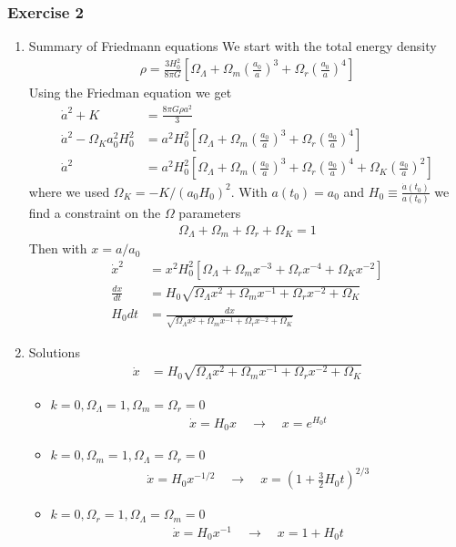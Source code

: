 \documentclass[10pt,a4paper]{article}
\theoremstyle{definition}
\begin{document}
\subsubsection{Exercise 2}
\begin{enumerate}
\item Summary of Friedmann equations
We start with the total energy density
\begin{align}
\rho=\frac{3H_0^2}{8\pi G}\left[
\Omega_\Lambda+
\Omega_m\left(\frac{a_0}{a}\right)^3+
\Omega_r\left(\frac{a_0}{a}\right)^4\right]
\end{align}
Using the Friedman equation we get
\begin{align}
\dot{a}^2+K
&=\frac{8\pi G\rho a^2}{3}\\
\dot{a}^2-\Omega_Ka_0^2H_0^2&=a^2H_0^2\left[
\Omega_\Lambda+
\Omega_m\left(\frac{a_0}{a}\right)^3+
\Omega_r\left(\frac{a_0}{a}\right)^4\right]\\
\dot{a}^2&=a^2H_0^2\left[
\Omega_\Lambda+
\Omega_m\left(\frac{a_0}{a}\right)^3+
\Omega_r\left(\frac{a_0}{a}\right)^4+
\Omega_K\left(\frac{a_0}{a}\right)^2\right]
\end{align}
where we used $\Omega_K=-K/(a_0H_0)^2$. With $a(t_0)=a_0$ and $H_0\equiv\frac{\dot{a}(t_0)}{a(t_0)}$ we find a constraint on the $\Omega$ parameters
\begin{align}
\Omega_\Lambda+\Omega_m+\Omega_r+\Omega_K=1
\end{align}
Then with $x=a/a_0$
\begin{align}
\dot{x}^2&=x^2H_0^2\left[
\Omega_\Lambda+
\Omega_m x^{-3}+
\Omega_r x^{-4}+
\Omega_K x^{-2}\right]\\
\frac{dx}{dt}&=H_0\sqrt{
\Omega_\Lambda x^2+
\Omega_m x^{-1}+
\Omega_r x^{-2}+
\Omega_K}\\
H_0dt&=
\frac{dx}{\sqrt{
\Omega_\Lambda x^2+
\Omega_m x^{-1}+
\Omega_r x^{-2}+
\Omega_K}}
\end{align}
\item Solutions
\begin{align}
\dot{x}&=H_0\sqrt{
\Omega_\Lambda x^2+
\Omega_m x^{-1}+
\Omega_r x^{-2}+
\Omega_K}
\end{align}
\begin{itemize}
\item $k=0, \Omega_\Lambda=1,\Omega_m=\Omega_r=0$
\begin{align}
\dot{x}=H_0x\quad\rightarrow\quad x=e^{H_0t}
\end{align}

\item $k=0, \Omega_m=1,\Omega_\Lambda=\Omega_r=0$
\begin{align}
\dot{x}=H_0x^{-1/2}\quad\rightarrow\quad x=\left(1+\frac{3}{2}H_0t\right)^{2/3}
\end{align}

\item $k=0, \Omega_r=1,\Omega_\Lambda=\Omega_m=0$
\begin{align}
\dot{x}=H_0x^{-1}\quad\rightarrow\quad x=1+H_0t
\end{align}


\end{itemize}
\end{enumerate}
\end{document}
